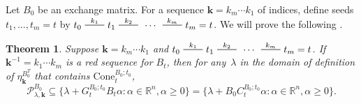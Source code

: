\documentclass{amsart}
\newtheorem{theorem}[proposition]{Theorem}
\theoremstyle{definition}
\theoremstyle{remark}
\numberwithin{equation}{section}
\newcommand{\reals}{\mathbb R}
\newcommand{\edge}{\,\,\rule[2.7pt]{20pt}{0.5pt}\,\,}
\newcommand{\set}[1]{{\lbrace #1 \rbrace}}
\newcommand{\0}{{\mathbf{0}}}
\newcommand{\Cone}{\mathrm{Cone}}
\newcommand{\kk}{{\boldsymbol{k}}}
\renewcommand{\P}{\mathcal{P}}
\begin{document}
Let $B_0$ be an exchange matrix.
For a sequence $\kk=k_m\cdots k_1$ of indices, define seeds $t_1,\ldots,t_m=t$ by $t_0\overset{k_1}{\edge}t_1\overset{k_2}{\edge}\,\cdots\,\overset{k_m}{\edge}t_m=t$.
We will prove the following .
%
%
%
%
%
%
%
%
%
%

\begin{theorem}\label{P in B0C}
Suppose $\kk=k_m\cdots k_1$ and $t_0\overset{k_1}{\edge}t_1\overset{k_2}{\edge}\,\cdots\,\overset{k_m}{\edge}t_m=t$.
If $\kk^{-1}=k_1\cdots k_m$ is a red sequence for $B_t$, then for any~$\lambda$ in the domain of definition of $\eta_\kk^{B_0^T}$ that contains $\Cone^{B_0;t_0}_t$,
\[\P^{B_0}_{\lambda,\kk}\subseteq\set{\lambda+G_t^{B_0;t_0}B_t\alpha:\alpha\in\reals^n,\alpha\ge0}=\set{\lambda+B_0C_t^{B_0;t_0}\alpha:\alpha\in\reals^n,\alpha\ge0}.\]
\end{theorem}
\end{document}
